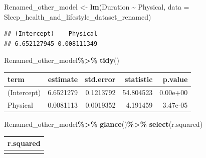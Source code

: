 \documentclass[
  11pt,
]{article}
\newenvironment{Shaded}{\begin{snugshade}}{\end{snugshade}}
\newcommand{\AttributeTok}[1]{\textcolor[rgb]{0.13,0.29,0.53}{#1}}
\newcommand{\FunctionTok}[1]{\textcolor[rgb]{0.13,0.29,0.53}{\textbf{#1}}}
\newcommand{\NormalTok}[1]{#1}
\newcommand{\OtherTok}[1]{\textcolor[rgb]{0.56,0.35,0.01}{#1}}
\newcommand{\SpecialCharTok}[1]{\textcolor[rgb]{0.81,0.36,0.00}{\textbf{#1}}}
\begin{document}
\begin{Shaded}
\begin{Highlighting}[]
\NormalTok{Renamed\_other\_model }\OtherTok{\textless{}{-}} \FunctionTok{lm}\NormalTok{(Duration }\SpecialCharTok{\textasciitilde{}}\NormalTok{ Physical, }\AttributeTok{data =}\NormalTok{ Sleep\_health\_and\_lifestyle\_dataset\_renamed)}
\end{Highlighting}
\end{Shaded}

\begin{Shaded}
\end{Shaded}

\begin{verbatim}
## (Intercept)    Physical 
## 6.652127945 0.008111349
\end{verbatim}

\begin{Shaded}
\begin{Highlighting}[]
\NormalTok{Renamed\_other\_model}\SpecialCharTok{\%\textgreater{}\%}
  \FunctionTok{tidy}\NormalTok{()}
\end{Highlighting}
\end{Shaded}

\begin{longtable}[]{@{}lrrrr@{}}
\toprule\noalign{}
term & estimate & std.error & statistic & p.value \\
\midrule\noalign{}
\endhead
\bottomrule\noalign{}
\endlastfoot
(Intercept) & 6.6521279 & 0.1213792 & 54.804523 & 0.00e+00 \\
Physical & 0.0081113 & 0.0019352 & 4.191459 & 3.47e-05 \\
\end{longtable}

\begin{Shaded}
\begin{Highlighting}[]
\NormalTok{Renamed\_other\_model}\SpecialCharTok{\%\textgreater{}\%}
  \FunctionTok{glance}\NormalTok{()}\SpecialCharTok{\%\textgreater{}\%}
  \FunctionTok{select}\NormalTok{(r.squared)}
\end{Highlighting}
\end{Shaded}

\begin{longtable}[]{@{}r@{}}
\toprule\noalign{}
r.squared \\
\midrule\noalign{}
\endhead
\bottomrule\noalign{}
\endlastfoot
0.0450969 \\
\end{longtable}
\end{document}
